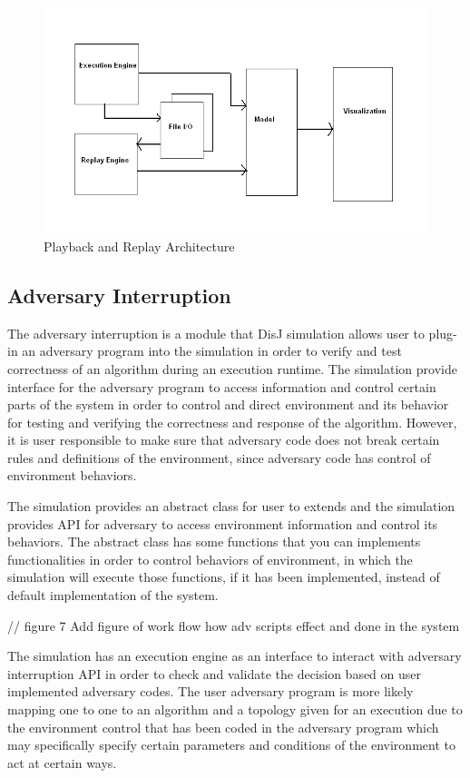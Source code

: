 \begin{figure}[ht!]
\includegraphics[width=1.0\textwidth,keepaspectratio]{./figure46}
\caption{Playback and Replay Architecture}
\label{pic:fig46}
\end{figure}


\subsection{Adversary Interruption}

The adversary interruption is a module that DisJ simulation allows user to plug-in an adversary program into the simulation in order to verify and test correctness of an algorithm during an execution runtime. The simulation provide interface for the adversary program to access information and control certain parts of the system in order to control and direct environment and its behavior for testing and verifying the correctness and response of the algorithm. However, it is user responsible to make sure that adversary code does not break certain rules and definitions of the environment, since adversary code has control of environment behaviors.

The simulation provides an abstract class for user to extends and the simulation provides API for adversary to access environment information and control its behaviors. The abstract class has some functions that you can implements functionalities in order to control behaviors of environment, in which the simulation will execute those functions, if it has been implemented, instead of default implementation of the system.

// figure 7 Add figure of work flow how adv scripts effect and done in the system


The simulation has an execution engine as an interface to interact with adversary interruption API in order to check and validate the decision based on user implemented adversary codes. The user adversary program is more likely mapping one to one to an algorithm and a topology given for an execution due to the environment control that has been coded in the adversary program which may specifically specify certain parameters and conditions of the environment to act at certain ways.


